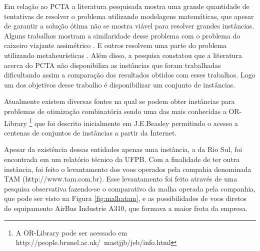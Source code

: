 Em relação ao PCTA a literatura pesquisada \cite{ahmed2009} \cite{arguelo1997}
\cite{cordeau2001} \cite{mohamed2011} \cite{abiliolivro} mostra uma grande quantidade de
tentativas de resolver o problema utilizando modelagens matemáticas, que apesar
de garantir a solução ótima não se mostra viável para resolver grandes
instâncias. Alguns trabalhos mostram a similaridade desse problema com o
problema do caixeiro viajante assimétrico \cite{clarke97}. E outros resolvem
uma parte do problema utilizando metaheurísticas \cite{arguelo1997}. Além disso,
a pesquisa constatou que a literatura acerca do PCTA não disponibiliza as
instâncias que foram trabalhadas dificultando assim a comparação dos
resultados obtidos com esses trabalhos. Logo um dos objetivos desse trabalho é
disponibilizar um conjunto de instâncias.


Atualmente existem diversas fontes na qual se podem obter instâncias para
problemas de otimização combinatória sendo uma das mais conhecidas a
OR-Library \footnote{ A OR-Library pode ser acessado em
http://people.brunel.ac.uk/~mastjjb/jeb/info.html} que foi descrito
inicialmente em J.E.Beasley \cite{orlibrary} permitindo o acesso a centenas de
conjuntos de instâncias a partir da Internet.
  
Apesar da existência dessas entidades apenas uma instância, a da Rio Sul, foi
encontrada em um relatório técnico da UFPB. Com a finalidade de ter outra
instância, foi feito o levantamento dos voos operados pela
compahia denominada TAM (http://www.tam.com.br). Esse levantamento foi feito
através de uma pesquisa observativa fazendo-se o comparativo da malha operada
pela companhia, que pode ser visto na Figura \ref{fig:malhatam}, e as
possibilidades de voos diretos do equipamento AirBus Industrie A310, que formava
a maior frota da empresa.
	
